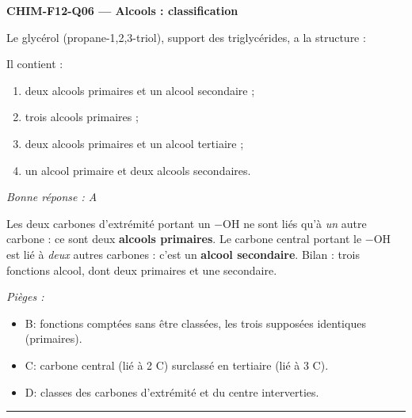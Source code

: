 \documentclass[11pt,a4paper]{article}
\begin{document}
\noindent\textbf{CHIM-F12-Q06 --- Alcools : classification}\par
Le glycérol (propane-1,2,3-triol), support des triglycérides, a la structure :
\begin{center}\end{center}
Il contient :
\begin{enumerate}[label=\Alph*)]
\item deux alcools primaires et un alcool secondaire ;
\item trois alcools primaires ;
\item deux alcools primaires et un alcool tertiaire ;
\item un alcool primaire et deux alcools secondaires.
\end{enumerate}
\textit{Bonne réponse : A}\par
Les deux carbones d'extrémité portant un $-\text{OH}$ ne sont liés qu'à \emph{un} autre carbone : ce sont deux \textbf{alcools primaires}. Le carbone central portant le $-\text{OH}$ est lié à \emph{deux} autres carbones : c'est un \textbf{alcool secondaire}. Bilan : trois fonctions alcool, dont deux primaires et une secondaire.\par
\textit{Pièges :}
\begin{itemize}
\item B: fonctions comptées sans être classées, les trois supposées identiques (primaires).
\item C: carbone central (lié à 2 C) surclassé en tertiaire (lié à 3 C).
\item D: classes des carbones d'extrémité et du centre interverties.
\end{itemize}
\vspace{8pt}\hrule\vspace{8pt}
\end{document}
